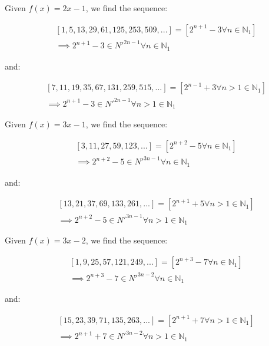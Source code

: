 \documentclass{article}
\begin{document}
\noindent
Given \begin{math}f(x)=2x-1\end{math}, we find the sequence:

\begin{displaymath}\begin{aligned}
& [1, 5, 13, 29, 61, 125, 253, 509, ...] = [2^{n+1}-3 \forall n \in \mathbb{N}_{1}] \\
& \implies 2^{n+1}-3 \in N'^{2n-1} \forall n \in \mathbb{N}_{1}
\end{aligned}\end{displaymath}

\noindent
and:

\begin{displaymath}\begin{aligned}
& [7, 11, 19, 35, 67, 131, 259, 515, ...] = [2^{n-1}+3 \forall n>1 \in \mathbb{N}_{1}] \\
& \implies 2^{n+1}-3 \in N'^{2n-1} \forall n>1 \in \mathbb{N}_{1}
\end{aligned}\end{displaymath}

\noindent
Given \begin{math}f(x)=3x-1\end{math}, we find the sequence:

\begin{displaymath}\begin{aligned}
& [3, 11, 27, 59, 123, ...] = [2^{n+2}-5 \forall n \in \mathbb{N}_{1}] \\
& \implies 2^{n+2}-5 \in N'^{3n-1} \forall n \in \mathbb{N}_{1}
\end{aligned}\end{displaymath}

\noindent
and:

\begin{displaymath}\begin{aligned}
& [13, 21, 37, 69, 133, 261, ...] = [2^{n+1}+5 \forall n>1 \in \mathbb{N}_{1}] \\
& \implies 2^{n+2}-5 \in N'^{3n-1} \forall n>1 \in \mathbb{N}_{1}
\end{aligned}\end{displaymath}

\noindent
Given \begin{math}f(x)=3x-2\end{math}, we find the sequence:

\begin{displaymath}\begin{aligned}
& [1, 9, 25, 57, 121, 249, ...] = [2^{n+3}-7 \forall n \in \mathbb{N}_{1}] \\
& \implies 2^{n+3}-7 \in N'^{3n-2} \forall n \in \mathbb{N}_{1}
\end{aligned}\end{displaymath}

\noindent
and:

\begin{displaymath}\begin{aligned}
& [15, 23, 39, 71, 135, 263, ...] = [2^{n+1}+7 \forall n>1 \in \mathbb{N}_{1}] \\
& \implies 2^{n+1}+7 \in N'^{3n-2} \forall n>1 \in \mathbb{N}_{1}
\end{aligned}\end{displaymath}
\end{document}
